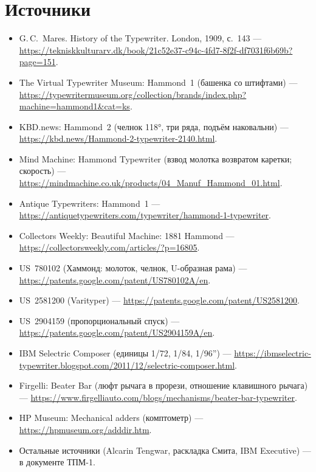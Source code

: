 \section*{Источники}
\begin{itemize}\small
  \item G.\,C.~Mares. History of the Typewriter. London, 1909, с.~143 — \url{https://tekniskkulturarv.dk/book/21c52e37-c94c-4fd7-8f2f-df7031f6b69b?page=151}.
  \item The Virtual Typewriter Museum: Hammond~1 (башенка со штифтами) — \url{https://typewritermuseum.org/collection/brands/index.php?machine=hammond1&cat=ks}.
  \item KBD.news: Hammond~2 (челнок 118°, три ряда, подъём наковальни) — \url{https://kbd.news/Hammond-2-typewriter-2140.html}.
  \item Mind Machine: Hammond Typewriter (взвод молотка возвратом каретки; скорость) — \url{https://mindmachine.co.uk/products/04_Manuf_Hammond_01.html}.
  \item Antique Typewriters: Hammond~1 — \url{https://antiquetypewriters.com/typewriter/hammond-1-typewriter}.
  \item Collectors Weekly: Beautiful Machine: 1881 Hammond — \url{https://collectorsweekly.com/articles/?p=16805}.
  \item US~780102 (Хаммонд: молоток, челнок, U-образная рама) — \url{https://patents.google.com/patent/US780102A/en}.
  \item US~2581200 (Varityper) — \url{https://patents.google.com/patent/US2581200}.
  \item US~2904159 (пропорциональный спуск) — \url{https://patents.google.com/patent/US2904159A/en}.
  \item IBM Selectric Composer (единицы 1/72, 1/84, 1/96'') — \url{https://ibmselectric-typewriter.blogspot.com/2011/12/selectric-composer.html}.
  \item Firgelli: Beater Bar (люфт рычага в прорези, отношение клавишного рычага) — \url{https://www.firgelliauto.com/blogs/mechanisms/beater-bar-typewriter}.
  \item HP Museum: Mechanical adders (комптометр) — \url{https://hpmuseum.org/adddir.htm}.
  \item Остальные источники (Alcarin Tengwar, раскладка Смита, IBM Executive) — в документе ТПМ-1.
\end{itemize}


